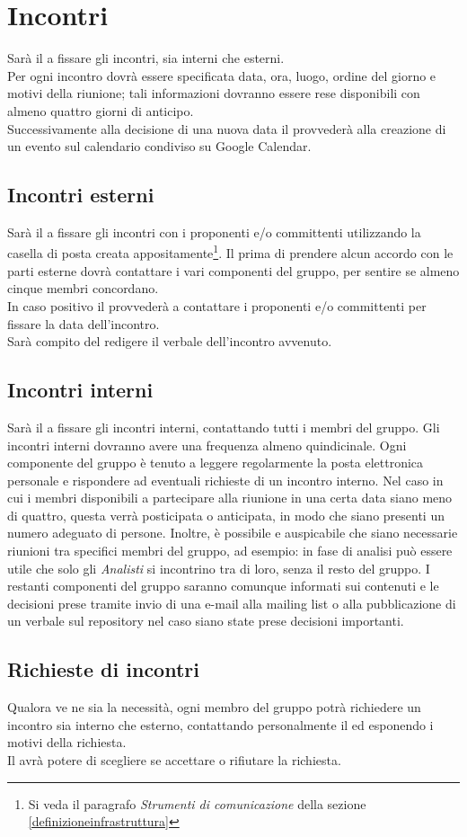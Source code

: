 \section{Incontri}
\label{incontri}
Sarà il \projectManager{} a fissare gli incontri, sia interni che esterni.
\\Per ogni incontro dovrà essere specificata data, ora, luogo, ordine del giorno e motivi della riunione; tali informazioni dovranno essere rese disponibili con almeno quattro giorni di anticipo.
\\Successivamente alla decisione di una nuova data il \projectManager{} provvederà alla creazione di un evento sul calendario condiviso su Google Calendar\glossario{}.
\subsection{Incontri esterni}
\label{iesterni}
Sarà il \projectManager{} a fissare gli incontri con i proponenti e/o committenti utilizzando la casella di posta creata appositamente\footnote{Si veda il paragrafo \textit{Strumenti di comunicazione} della sezione \ref{definizioneinfrastruttura}}.
Il \projectManager{} prima di prendere alcun accordo con le parti esterne dovrà contattare i vari componenti del gruppo, per sentire se almeno cinque membri concordano.
\\In caso positivo il \projectManager{} provvederà a contattare i proponenti e/o committenti per fissare la data dell'incontro.
\\Sarà compito del \projectManager{} redigere il verbale dell'incontro avvenuto.
\subsection{Incontri interni}
\label{iinterni}
Sarà il \projectManager{} a fissare gli incontri interni, contattando tutti i membri del gruppo. Gli incontri interni dovranno avere una frequenza almeno quindicinale.
Ogni componente del gruppo è tenuto a leggere regolarmente la posta elettronica personale e rispondere ad eventuali richieste di un incontro interno.
Nel caso in cui i membri disponibili a partecipare alla riunione in una certa data siano meno di quattro, questa verrà posticipata o anticipata, in modo che siano presenti un numero adeguato di persone.
Inoltre, è possibile e auspicabile che siano necessarie riunioni tra specifici membri del gruppo, ad esempio: in fase di analisi può essere utile che solo gli \emph{Analisti} si incontrino tra di loro, senza il resto del gruppo.
I restanti componenti del gruppo saranno comunque informati sui contenuti e le decisioni prese tramite invio di una e-mail alla mailing list\glossario{} o alla pubblicazione di un verbale sul repository\glossario{} nel caso siano state prese decisioni importanti.
\subsection{Richieste di incontri}
\label{rincontri}
Qualora ve ne sia la necessità, ogni membro del gruppo potrà richiedere un incontro sia interno che esterno, contattando personalmente il \projectManager{} ed esponendo i motivi della richiesta.
\\Il \projectManager{} avrà potere di scegliere se accettare o rifiutare la richiesta.